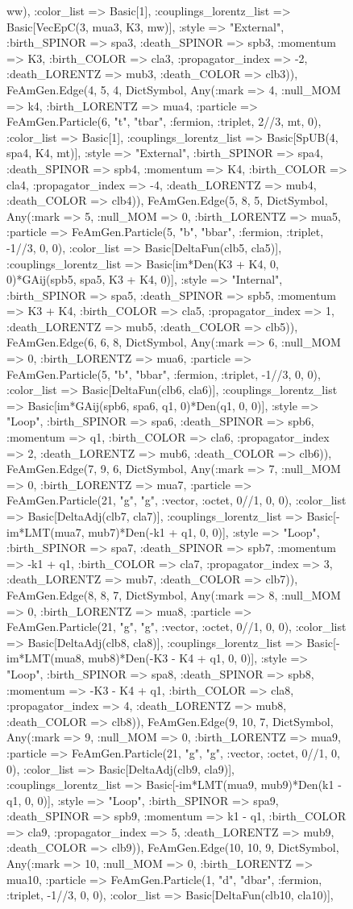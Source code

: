 \documentclass{revtex4}
\begin{document}
\begin{figure}[!htb]
\begin{center}
{ww), :color_list => Basic[1], :couplings_lorentz_list => Basic[VecEpC(3, mua3, K3, mw)], :style => "External", :birth_SPINOR => spa3, :death_SPINOR => spb3, :momentum => K3, :birth_COLOR => cla3, :propagator_index => -2, :death_LORENTZ => mub3, :death_COLOR => clb3)), FeAmGen.Edge(4, 5, 4, Dict{Symbol, Any}(:mark => 4, :null_MOM => k4, :birth_LORENTZ => mua4, :particle => FeAmGen.Particle(6, "t", "tbar", :fermion, :triplet, 2//3, mt, 0), :color_list => Basic[1], :couplings_lorentz_list => Basic[SpUB(4, spa4, K4, mt)], :style => "External", :birth_SPINOR => spa4, :death_SPINOR => spb4, :momentum => K4, :birth_COLOR => cla4, :propagator_index => -4, :death_LORENTZ => mub4, :death_COLOR => clb4)), FeAmGen.Edge(5, 8, 5, Dict{Symbol, Any}(:mark => 5, :null_MOM => 0, :birth_LORENTZ => mua5, :particle => FeAmGen.Particle(5, "b", "bbar", :fermion, :triplet, -1//3, 0, 0), :color_list => Basic[DeltaFun(clb5, cla5)], :couplings_lorentz_list => Basic[im*Den(K3 + K4, 0, 0)*GAij(spb5, spa5, K3 + K4, 0)], :style => "Internal", :birth_SPINOR => spa5, :death_SPINOR => spb5, :momentum => K3 + K4, :birth_COLOR => cla5, :propagator_index => 1, :death_LORENTZ => mub5, :death_COLOR => clb5)), FeAmGen.Edge(6, 6, 8, Dict{Symbol, Any}(:mark => 6, :null_MOM => 0, :birth_LORENTZ => mua6, :particle => FeAmGen.Particle(5, "b", "bbar", :fermion, :triplet, -1//3, 0, 0), :color_list => Basic[DeltaFun(clb6, cla6)], :couplings_lorentz_list => Basic[im*GAij(spb6, spa6, q1, 0)*Den(q1, 0, 0)], :style => "Loop", :birth_SPINOR => spa6, :death_SPINOR => spb6, :momentum => q1, :birth_COLOR => cla6, :propagator_index => 2, :death_LORENTZ => mub6, :death_COLOR => clb6)), FeAmGen.Edge(7, 9, 6, Dict{Symbol, Any}(:mark => 7, :null_MOM => 0, :birth_LORENTZ => mua7, :particle => FeAmGen.Particle(21, "g", "g", :vector, :octet, 0//1, 0, 0), :color_list => Basic[DeltaAdj(clb7, cla7)], :couplings_lorentz_list => Basic[-im*LMT(mua7, mub7)*Den(-k1 + q1, 0, 0)], :style => "Loop", :birth_SPINOR => spa7, :death_SPINOR => spb7, :momentum => -k1 + q1, :birth_COLOR => cla7, :propagator_index => 3, :death_LORENTZ => mub7, :death_COLOR => clb7)), FeAmGen.Edge(8, 8, 7, Dict{Symbol, Any}(:mark => 8, :null_MOM => 0, :birth_LORENTZ => mua8, :particle => FeAmGen.Particle(21, "g", "g", :vector, :octet, 0//1, 0, 0), :color_list => Basic[DeltaAdj(clb8, cla8)], :couplings_lorentz_list => Basic[-im*LMT(mua8, mub8)*Den(-K3 - K4 + q1, 0, 0)], :style => "Loop", :birth_SPINOR => spa8, :death_SPINOR => spb8, :momentum => -K3 - K4 + q1, :birth_COLOR => cla8, :propagator_index => 4, :death_LORENTZ => mub8, :death_COLOR => clb8)), FeAmGen.Edge(9, 10, 7, Dict{Symbol, Any}(:mark => 9, :null_MOM => 0, :birth_LORENTZ => mua9, :particle => FeAmGen.Particle(21, "g", "g", :vector, :octet, 0//1, 0, 0), :color_list => Basic[DeltaAdj(clb9, cla9)], :couplings_lorentz_list => Basic[-im*LMT(mua9, mub9)*Den(k1 - q1, 0, 0)], :style => "Loop", :birth_SPINOR => spa9, :death_SPINOR => spb9, :momentum => k1 - q1, :birth_COLOR => cla9, :propagator_index => 5, :death_LORENTZ => mub9, :death_COLOR => clb9)), FeAmGen.Edge(10, 10, 9, Dict{Symbol, Any}(:mark => 10, :null_MOM => 0, :birth_LORENTZ => mua10, :particle => FeAmGen.Particle(1, "d", "dbar", :fermion, :triplet, -1//3, 0, 0), :color_list => Basic[DeltaFun(clb10, cla10)], }
\end{center}
\end{figure}
\end{document}
